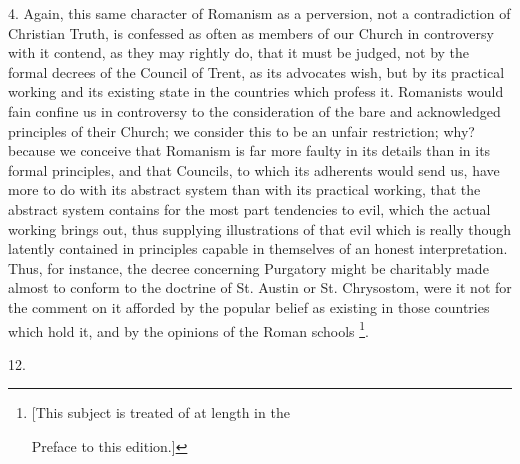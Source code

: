 4. Again, this same character of Romanism as a perversion, not a
contradiction of Christian Truth, is confessed as often as members of
our Church in controversy with it contend, as they may rightly do,
that it must be judged, not by the formal decrees of the Council of
Trent, as its advocates wish, but by its practical working and its
existing state in the countries which profess it. Romanists would fain
confine us in controversy to the consideration of the bare and
acknowledged principles of their Church; we consider this to be an
unfair restriction; why? because we conceive that Romanism is far more
faulty in its details than in its formal principles, and that
Councils, to which its adherents would send us, have more to do with
its abstract system than with its practical working, that the abstract
system contains for the most part tendencies to evil, which the actual
working brings out, thus supplying illustrations of that evil which is
really though latently contained in principles capable in themselves
of an honest interpretation. Thus, for instance, the decree concerning
Purgatory might be charitably made almost to conform to the
doctrine of St. Austin or St. Chrysostom, were it not for the comment
on it afforded by the popular belief as existing in those countries
which hold it, and by the opinions of the Roman schools \footnote{[This subject is treated of at length in the

Preface to this edition.]}.

12.

